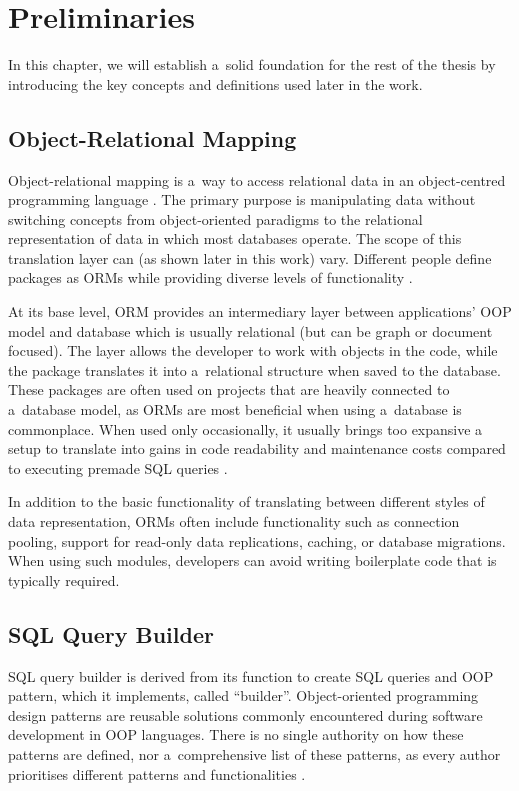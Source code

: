 \chapter{Preliminaries}\label{ch:preliminaries}

In this chapter, we will establish a~solid foundation for the rest of the thesis
by introducing the key concepts and definitions used later in the work.

\section*{Object-Relational Mapping}
Object-relational mapping is a~way to access relational data in an
object-centred programming language \cite{agile-mapping-objects}. The primary
purpose is manipulating data without switching concepts from object-oriented
paradigms to the relational representation of data in which most databases
operate. The scope of this translation layer can (as shown later in this work)
vary. Different people define packages as ORMs while providing diverse levels of
functionality \cite{artima-abstractions}.

At its base level, ORM provides an intermediary layer between applications' OOP
model and database which is usually relational (but can be graph or document
focused). The layer allows the developer to work with objects in the code, while
the package translates it into a~relational structure when saved to the
database. These packages are often used on projects that are heavily connected
to a~database model, as ORMs are most beneficial when using a~database is
commonplace. When used only occasionally, it usually brings too expansive a
setup to translate into gains in code readability and maintenance costs compared
to executing premade SQL queries \cite{Torres_Galante_Pimenta_Martins_2017}.

In addition to the basic functionality of translating between different styles
of data representation, ORMs often include functionality such as connection
pooling, support for read-only data replications, caching, or database
migrations. When using such modules, developers can avoid writing boilerplate
code that is typically required.


\section*{SQL Query Builder}
SQL query builder is derived from its function to create SQL queries and OOP
pattern, which it implements, called \enquote{builder}. Object-oriented
programming design patterns are reusable solutions commonly encountered during
software development in OOP languages. There is no single authority on
how these patterns are defined, nor a~comprehensive list of these patterns, as
every author prioritises different patterns and functionalities
\cite{fowler-patterns-2003}.

